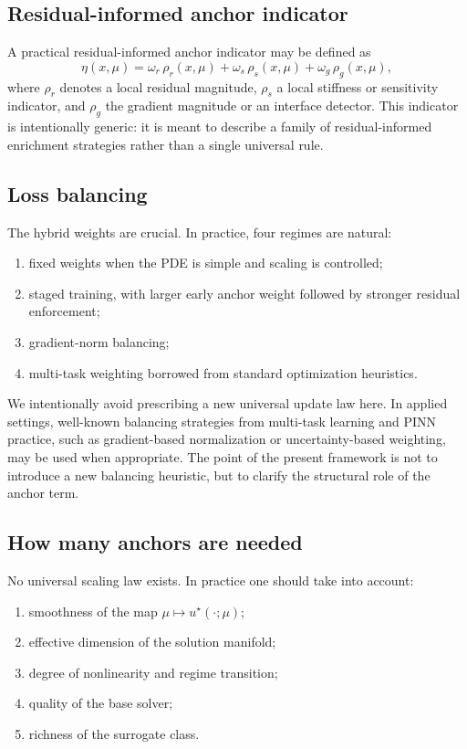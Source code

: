 \documentclass[preprint,12pt]{elsarticle}
\theoremstyle{definition}
\numberwithin{equation}{section}
\begin{document}
\subsection{Residual-informed anchor indicator}

A practical residual-informed anchor indicator may be defined as
\[
\eta(x,\mu)=\omega_r\,\rho_r(x,\mu)+\omega_s\,\rho_s(x,\mu)+\omega_g\,\rho_g(x,\mu),
\]
where $\rho_r$ denotes a local residual magnitude, $\rho_s$ a local stiffness or sensitivity indicator, and $\rho_g$ the gradient magnitude or an interface detector. This indicator is intentionally generic: it is meant to describe a family of residual-informed enrichment strategies rather than a single universal rule.

\subsection{Loss balancing}

The hybrid weights are crucial. In practice, four regimes are natural:
\begin{enumerate}[label=\arabic*)]
    \item fixed weights when the PDE is simple and scaling is controlled;
    \item staged training, with larger early anchor weight followed by stronger residual enforcement;
    \item gradient-norm balancing;
    \item multi-task weighting borrowed from standard optimization heuristics.
\end{enumerate}

We intentionally avoid prescribing a new universal update law here. In applied settings, well-known balancing strategies from multi-task learning and PINN practice, such as gradient-based normalization or uncertainty-based weighting, may be used when appropriate. The point of the present framework is not to introduce a new balancing heuristic, but to clarify the structural role of the anchor term.

\subsection{How many anchors are needed}

No universal scaling law exists. In practice one should take into account:
\begin{enumerate}[label=\arabic*)]
    \item smoothness of the map $\mu\mapsto u^\star(\cdot;\mu)$;
    \item effective dimension of the solution manifold;
    \item degree of nonlinearity and regime transition;
    \item quality of the base solver;
    \item richness of the surrogate class.
\end{enumerate}
\end{document}
